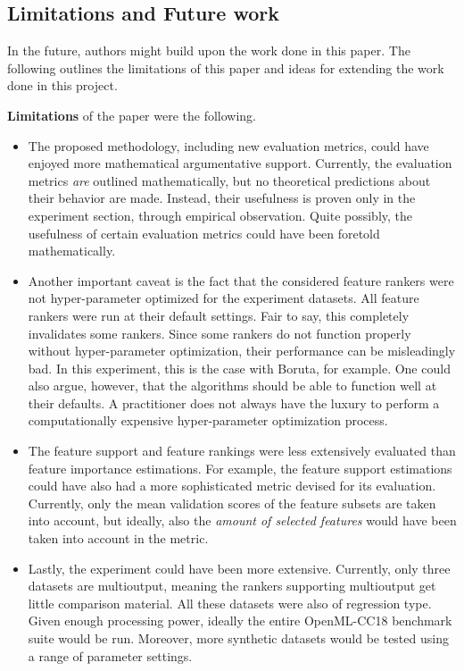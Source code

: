 \documentclass[../main.tex]{subfiles}
\begin{document}
\subsection{Limitations and Future work}
In the future, authors might build upon the work done in this paper. The following outlines the limitations of this paper and ideas for extending the work done in this project.

\textbf{Limitations} of the paper were the following.
\begin{itemize}
    \item The proposed methodology, including new evaluation metrics, could have enjoyed more mathematical argumentative support. Currently, the evaluation metrics \textit{are} outlined mathematically, but no theoretical predictions about their behavior are made. Instead, their usefulness is proven only in the experiment section, through empirical observation. Quite possibly, the usefulness of certain evaluation metrics could have been foretold mathematically.
    \item Another important caveat is the fact that the considered feature rankers were not hyper-parameter optimized for the experiment datasets. All feature rankers were run at their default settings. Fair to say, this completely invalidates some rankers. Since some rankers do not function properly without hyper-parameter optimization, their performance can be misleadingly bad. In this experiment, this is the case with Boruta, for example. One could also argue, however, that the algorithms should be able to function well at their defaults. A practitioner does not always have the luxury to perform a computationally expensive hyper-parameter optimization process.
    \item The feature support and feature rankings were less extensively evaluated than feature importance estimations. For example, the feature support estimations could have also had a more sophisticated metric devised for its evaluation. Currently, only the mean validation scores of the feature subsets are taken into account, but ideally, also the \textit{amount of selected features} would have been taken into account in the metric.
    \item Lastly, the experiment could have been more extensive. Currently, only three datasets are multioutput, meaning the rankers supporting multioutput get little comparison material. All these datasets were also of regression type. Given enough processing power, ideally the entire OpenML-CC18 benchmark suite would be run. Moreover, more synthetic datasets would be tested using a range of parameter settings.
\end{itemize}
\end{document}
